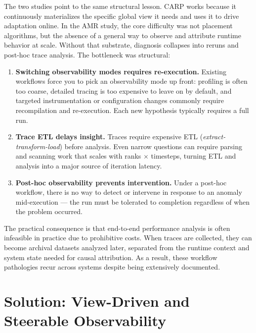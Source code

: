 The two studies point to the same structural lesson.
CARP works because it continuously materializes the specific global view it needs and uses it to
drive adaptation online.
In the AMR study, the core difficulty was not placement algorithms, but the absence of a general
way to observe and attribute runtime behavior at scale.
Without that substrate, diagnosis collapses into reruns and post-hoc trace analysis.
The bottleneck was structural:

\begin{enumerate}
  \item \textbf{Switching observability modes requires re-execution.
        }
        Existing workflows force you to pick an observability mode up front: profiling is often too
        coarse, detailed tracing is too expensive to leave on by default, and targeted instrumentation
        or configuration changes commonly require recompilation and re-execution.
        Each new hypothesis typically requires a full run.

  \item \textbf{Trace ETL delays insight.
        }
        Traces require expensive ETL (\emph{extract-transform-load}) before analysis.
        Even narrow questions can require parsing and scanning work that scales with ranks $\times$
        timesteps, turning ETL and analysis into a major source of iteration latency.

  \item \textbf{Post-hoc observability prevents intervention.
        }
        Under a post-hoc workflow, there is no way to detect or intervene in response
        to an anomaly mid-execution --- the run must be tolerated to completion
        regardless of when the problem occurred.
\end{enumerate}

The practical consequence is that end-to-end performance analysis is often infeasible in practice
due to prohibitive costs.
When traces are collected, they can become archival datasets analyzed later, separated from the
runtime context and system state needed for causal attribution.
As a result, these workflow pathologies recur across systems despite being extensively documented.


\section{Solution: View-Driven and Steerable Observability}
\label{sec:intro:sol}

